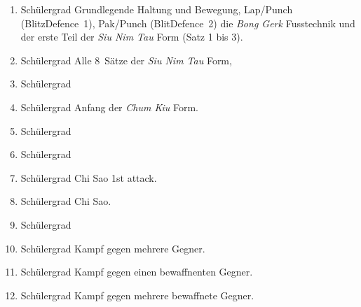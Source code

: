 \documentclass[a4paper,12pt]{scrartcl}
\begin{document}
\begin{enumerate}
	\item Sch\"ulergrad \newline%
	Grundlegende Haltung und Bewegung, Lap/Punch (BlitzDefence~1), Pak/Punch (BlitDefence~2) die \textit{Bong Gerk} Fusstechnik und der erste Teil der \textit{Siu Nim Tau} Form (Satz 1 bis 3).
	\item Sch\"ulergrad \newline%
	Alle 8~S\"atze der \textit{Siu Nim Tau} Form,  %
	\item Sch\"ulergrad \newline %
	\item Sch\"ulergrad \newline %
	Anfang der \textit{Chum Kiu} Form.%
	\item Sch\"ulergrad \newline %
	\item Sch\"ulergrad \newline %
	\item Sch\"ulergrad \newline %
	Chi Sao 1st attack.
	\item Sch\"ulergrad \newline %
	Chi Sao.
	\item Sch\"ulergrad \newline %
	\item Sch\"ulergrad \newline %
	Kampf gegen mehrere Gegner.
	\item Sch\"ulergrad \newline %
	Kampf gegen einen bewaffnenten Gegner.
	\item Sch\"ulergrad \newline %
	Kampf gegen mehrere bewaffnete Gegner.
	
\end{enumerate}
	
\end{document}
